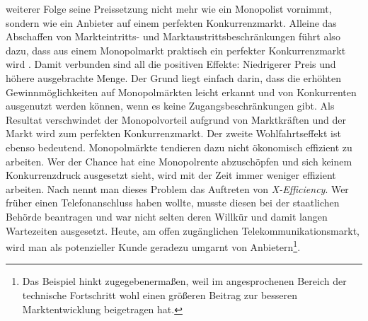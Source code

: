 weiterer Folge seine Preissetzung nicht mehr wie ein Monopolist vornimmt, sondern wie ein Anbieter auf einem perfekten Konkurrenzmarkt. Alleine das Abschaffen von Markteintritts- und Marktaustrittsbeschränkungen führt also dazu, dass aus einem Monopolmarkt praktisch ein perfekter Konkurrenzmarkt wird \parencite[S. 2]{Baumol1982b}. Damit verbunden sind all die positiven Effekte: Niedrigerer Preis und höhere ausgebrachte Menge. Der Grund liegt einfach darin, dass die erhöhten Gewinnmöglichkeiten auf Monopolmärkten leicht erkannt und von Konkurrenten ausgenutzt werden können, wenn es keine Zugangsbeschränkungen gibt. Als Resultat verschwindet der Monopolvorteil aufgrund von Marktkräften und der Markt wird zum perfekten Konkurrenzmarkt. Der zweite Wohlfahrtseffekt ist ebenso bedeutend. Monopolmärkte tendieren dazu nicht ökonomisch effizient zu arbeiten. Wer der Chance hat eine Monopolrente abzuschöpfen und sich keinem Konkurrenzdruck ausgesetzt sieht, wird mit der Zeit immer weniger effizient arbeiten. Nach \textcite{Leibenstein1966} nennt man dieses Problem das Auftreten von \textit{X-Efficiency}. Wer früher einen Telefonanschluss haben wollte, musste diesen bei der staatlichen Behörde beantragen und war nicht selten deren Willkür und damit langen Wartezeiten ausgesetzt. Heute, am offen zugänglichen Telekommunikationsmarkt, wird man als potenzieller Kunde geradezu umgarnt von Anbietern\footnote{Das Beispiel hinkt zugegebenermaßen, weil im angesprochenen Bereich der technische Fortschritt wohl einen größeren Beitrag zur besseren Marktentwicklung beigetragen hat.}. 
